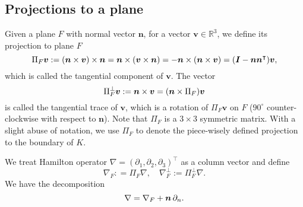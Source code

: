 \subsection{Projections to a plane}
Given a plane $F$ with normal vector $\boldsymbol  n$, for a vector $\boldsymbol  v\in \mathbb R^3$, we define its projection to plane $F$ 
$$
\Pi_F \boldsymbol  v := (\boldsymbol  n\times \boldsymbol  v)\times \boldsymbol  n = \boldsymbol  n\times (\boldsymbol  v\times \boldsymbol  n) = - \boldsymbol  n\times (\boldsymbol  n\times \boldsymbol  v) = (\boldsymbol I - \boldsymbol n\boldsymbol n^{\intercal})\boldsymbol v,
$$
which is called the tangential component of $\boldsymbol  v$. The vector $$\Pi_F^{\bot}\boldsymbol  v :=\boldsymbol  n\times \boldsymbol  v = (\boldsymbol n\times \Pi_F)\boldsymbol v$$ is called the tangential trace of $\boldsymbol  v$, which is a rotation of $\Pi_F \boldsymbol  v$ on $F$ ($90^{\circ}$ counter-clockwise with respect to $\boldsymbol  n$). Note that $\Pi_F$ is a $3\times 3$ symmetric matrix.
%
With a slight abuse of notation, we use $\Pi_F$ to denote the piece-wisely defined projection to the boundary of $K$.

We treat Hamilton operator $\nabla = (\partial_1, \partial_2, \partial_3)^{\intercal}$ as a column vector and define
$$
\nabla_F: = \Pi_F \nabla, \quad \nabla_F^{\bot} := \Pi_F^{\bot} \nabla.
$$
We have the decomposition
\begin{equation*}%
\nabla = \nabla_F + \bs n \, \partial_n. 
\end{equation*}

